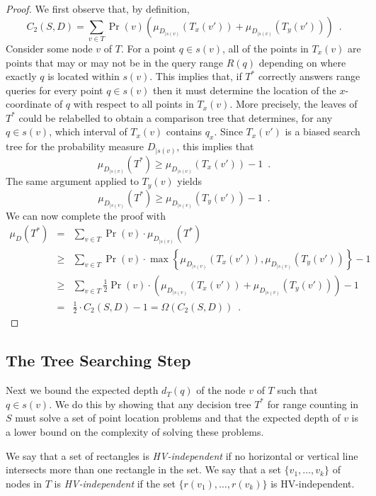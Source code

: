 \documentclass{patmorin}
\begin{document}
\begin{proof}
We first observe that, by definition,
\[
  C_2(S,D) =  \sum_{v\in T} 
              \Pr(v)\left( \mu_{D_{\mid s(v)}}(T_x(v'))
                               +  \mu_{D_{\mid s(v)}}(T_y(v')) \right)
           \enspace .
\]
Consider some node $v$ of $T$.  For a point $q\in s(v)$, all of the
points in $T_x(v)$ are points that may or may not be in the query
range $R(q)$ depending on where exactly $q$ is located within $s(v)$.
This implies that, if $T^*$ correctly answers range queries for every
point $q\in s(v)$ then it must determine the location of the
$x$-coordinate of $q$ with respect to all points in $T_x(v)$.  More
precisely, the leaves of $T^*$ could be relabelled to obtain a
comparison tree that determines, for any $q\in s(v)$, which interval
of $T_x(v)$ contains $q_x$.  Since $T_x(v')$ is a biased search tree
for the probability measure $D_{\mid s(v)}$, this implies that
\[
  \mu_{D_{\mid s(v)}}(T^*) \ge \mu_{D_{\mid s(v)}}(T_x(v')) - 1\enspace .
\]
The same argument applied to $T_y(v)$ yields 
\[
  \mu_{D_{\mid s(v)}}(T^*) \ge \mu_{D_{\mid s(v)}}(T_y(v')) - 1\enspace .
\]
We can now complete the proof with
\begin{eqnarray*}
\mu_D(T^*) 
 & = & \sum_{v\in T} \Pr(v)\cdot\mu_{D_{\mid s(v)}}(T^*) \\
 & \ge & \sum_{v\in T}
	\Pr(v) \cdot\max\left\{\mu_{D_{\mid s(v)}}(T_x(v')), 
		       \mu_{D_{\mid s(v)}}(T_y(v'))\right\} - 1 \\
 & \ge & \sum_{v\in T}
	\frac{1}{2}\Pr(v)\cdot\left( \mu_{D_{\mid s(v)}}(T_x(v'))
                             +  \mu_{D_{\mid s(v)}}(T_y(v')) \right) - 1 \\
 & = & \frac{1}{2}\cdot C_2(S,D) - 1 = \Omega(C_2(S,D)) \enspace .
\end{eqnarray*}
\end{proof}

\subsection{The Tree Searching Step}

Next we bound the expected depth $d_T(q)$ of the node $v$ of $T$ such
that $q\in s(v)$.  We do this by showing that any decision tree $T^*$
for range counting in $S$ must solve a set of point location problems
and that the expected depth of $v$ is a lower bound on the complexity
of solving these problems.

We say that a set of rectangles is \emph{HV-independent} if no
horizontal or vertical line intersects more than one rectangle in the
set.  We say that a set $\{v_1,\ldots,v_k\}$ of nodes in $T$ is
\emph{HV-independent} if the set $\{r(v_1),\ldots,r(v_k)\}$ is
HV-independent.
\end{document}

